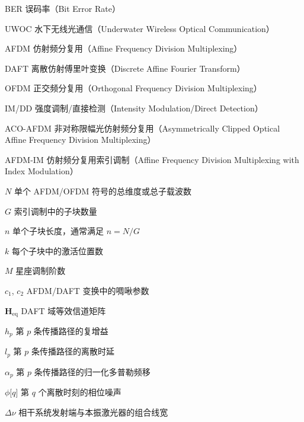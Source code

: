 
\begin{symbols}
  \item[BER] 误码率（Bit Error Rate）
  \item[UWOC] 水下无线光通信（Underwater Wireless Optical Communication）
  \item[AFDM] 仿射频分复用（Affine Frequency Division Multiplexing）
  \item[DAFT] 离散仿射傅里叶变换（Discrete Affine Fourier Transform）
  \item[OFDM] 正交频分复用（Orthogonal Frequency Division Multiplexing）
  \item[IM/DD] 强度调制/直接检测（Intensity Modulation/Direct Detection）
  \item[ACO-AFDM] 非对称限幅光仿射频分复用（Asymmetrically Clipped Optical Affine Frequency Division Multiplexing）
  \item[AFDM-IM] 仿射频分复用索引调制（Affine Frequency Division Multiplexing with Index Modulation）
  \item[$N$] 单个 AFDM/OFDM 符号的总维度或总子载波数
  \item[$G$] 索引调制中的子块数量
  \item[$n$] 单个子块长度，通常满足 $n=N/G$
  \item[$k$] 每个子块中的激活位置数
  \item[$M$] 星座调制阶数
  \item[$c_1$, $c_2$] AFDM/DAFT 变换中的啁啾参数
  \item[$\mathbf{H}_{\mathrm{eq}}$] DAFT 域等效信道矩阵
  \item[$h_p$] 第 $p$ 条传播路径的复增益
  \item[$l_p$] 第 $p$ 条传播路径的离散时延
  \item[$\alpha_p$] 第 $p$ 条传播路径的归一化多普勒频移
  \item[$\phi\lbrack q\rbrack$] 第 $q$ 个离散时刻的相位噪声
  \item[$\Delta\nu$] 相干系统发射端与本振激光器的组合线宽
\end{symbols}
